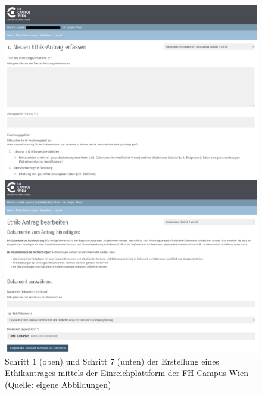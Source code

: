 \documentclass[a4paper,12pt,twoside]{scrreprt}
\begin{document}
\begin{figure}[htp]
    \centering
    \begin{minipage}[t]{.99\linewidth}
        \includegraphics[width=\linewidth]{thesis/images/Luidold_Einreichplattform-Formular-Schritt-1.png}
    \end{minipage}
    \begin{minipage}[b]{.99\linewidth}
        \includegraphics[width=\linewidth]{thesis/images/Luidold_Einreichplattform-Formular-Schritt-2.png}
    \end{minipage}
    \caption[Schritt 1 und Schritt 7 der Erstellung eines Ethikantrages mittels der Einreichplattform der FH Campus Wien]{Schritt 1 (oben) und Schritt 7 (unten) der Erstellung eines Ethikantrages mittels der Einreichplattform der FH Campus Wien (Quelle: eigene Abbildungen)}
    \label{fig:einreichplattform-fhcw-schritt-1-7}
\end{figure}
\end{document}
